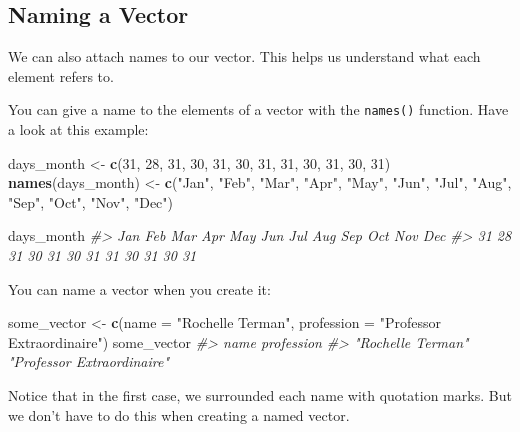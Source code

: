 \documentclass[]{book}
\newenvironment{Shaded}{\begin{snugshade}}{\end{snugshade}}
\newcommand{\KeywordTok}[1]{\textcolor[rgb]{0.13,0.29,0.53}{\textbf{#1}}}
\newcommand{\DataTypeTok}[1]{\textcolor[rgb]{0.13,0.29,0.53}{#1}}
\newcommand{\DecValTok}[1]{\textcolor[rgb]{0.00,0.00,0.81}{#1}}
\newcommand{\StringTok}[1]{\textcolor[rgb]{0.31,0.60,0.02}{#1}}
\newcommand{\CommentTok}[1]{\textcolor[rgb]{0.56,0.35,0.01}{\textit{#1}}}
\newcommand{\NormalTok}[1]{#1}
\begin{document}
\subsection{Naming a Vector}\label{naming-a-vector}

We can also attach names to our vector. This helps us understand what
each element refers to.

You can give a name to the elements of a vector with the
\texttt{names()} function. Have a look at this example:

\begin{Shaded}
\begin{Highlighting}[]
\NormalTok{days_month <-}\StringTok{ }\KeywordTok{c}\NormalTok{(}\DecValTok{31}\NormalTok{, }\DecValTok{28}\NormalTok{, }\DecValTok{31}\NormalTok{, }\DecValTok{30}\NormalTok{, }\DecValTok{31}\NormalTok{, }\DecValTok{30}\NormalTok{, }\DecValTok{31}\NormalTok{, }\DecValTok{31}\NormalTok{, }\DecValTok{30}\NormalTok{, }\DecValTok{31}\NormalTok{, }\DecValTok{30}\NormalTok{, }\DecValTok{31}\NormalTok{)}
\KeywordTok{names}\NormalTok{(days_month) <-}\StringTok{ }\KeywordTok{c}\NormalTok{(}\StringTok{"Jan"}\NormalTok{, }\StringTok{"Feb"}\NormalTok{, }\StringTok{"Mar"}\NormalTok{, }\StringTok{"Apr"}\NormalTok{, }\StringTok{"May"}\NormalTok{, }\StringTok{"Jun"}\NormalTok{, }\StringTok{"Jul"}\NormalTok{, }\StringTok{"Aug"}\NormalTok{, }\StringTok{"Sep"}\NormalTok{, }\StringTok{"Oct"}\NormalTok{, }\StringTok{"Nov"}\NormalTok{, }\StringTok{"Dec"}\NormalTok{)}

\NormalTok{days_month}
\CommentTok{#> Jan Feb Mar Apr May Jun Jul Aug Sep Oct Nov Dec }
\CommentTok{#>  31  28  31  30  31  30  31  31  30  31  30  31}
\end{Highlighting}
\end{Shaded}

You can name a vector when you create it:

\begin{Shaded}
\begin{Highlighting}[]
\NormalTok{some_vector <-}\StringTok{ }\KeywordTok{c}\NormalTok{(}\DataTypeTok{name =} \StringTok{"Rochelle Terman"}\NormalTok{, }\DataTypeTok{profession =} \StringTok{"Professor Extraordinaire"}\NormalTok{)}
\NormalTok{some_vector}
\CommentTok{#>                       name                 profession }
\CommentTok{#>          "Rochelle Terman" "Professor Extraordinaire"}
\end{Highlighting}
\end{Shaded}

Notice that in the first case, we surrounded each name with quotation
marks. But we don't have to do this when creating a named vector.
\end{document}
